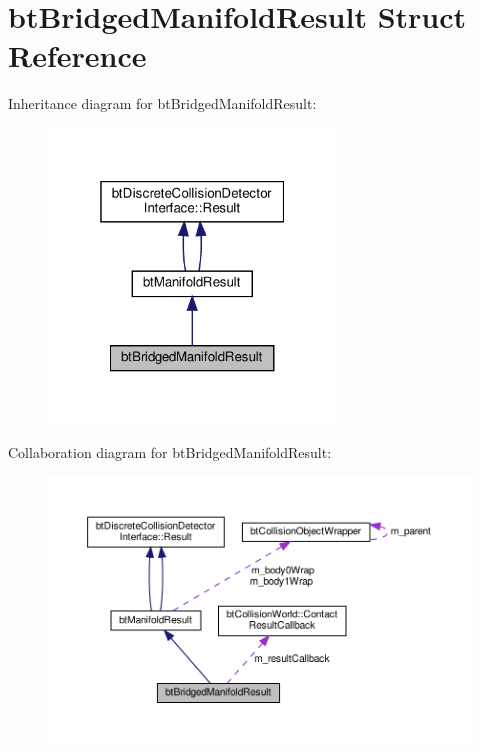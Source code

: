 \hypertarget{structbtBridgedManifoldResult}{}\section{bt\+Bridged\+Manifold\+Result Struct Reference}
\label{structbtBridgedManifoldResult}


Inheritance diagram for bt\+Bridged\+Manifold\+Result\+:
\nopagebreak
\begin{figure}[H]
\begin{center}
\leavevmode
\includegraphics[width=217pt]{structbtBridgedManifoldResult__inherit__graph}
\end{center}
\end{figure}


Collaboration diagram for bt\+Bridged\+Manifold\+Result\+:
\nopagebreak
\begin{figure}[H]
\begin{center}
\leavevmode
\includegraphics[width=350pt]{structbtBridgedManifoldResult__coll__graph}
\end{center}
\end{figure}
